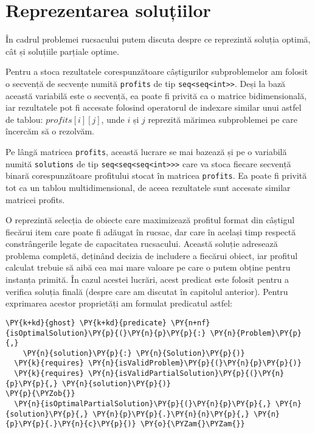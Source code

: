 \chapter{Reprezentarea soluțiilor}

\begin{sloppypar}

În cadrul problemei rucsacului putem discuta despre ce reprezintă soluția optimă, cât și soluțiile parțiale optime. \par
Pentru a stoca rezultatele corespunzătoare câștigurilor subproblemelor am folosit o secvență de secvențe numită \texttt{profits} de tip \texttt{seq<seq<int>>}. Deși la bază această variabilă este o secvență, ea poate fi privită ca o matrice bidimensională, iar rezultatele pot fi accesate folosind operatorul de indexare similar unui astfel de tablou: $profits[i][j]$, unde $i$ și $j$ reprezită mărimea subproblemei pe care încercăm să o rezolvăm. 
\par
Pe lângă matricea \texttt{profits}, această lucrare se mai bazează și pe o variabilă numită \texttt{solutions} de tip \texttt{seq<seq<seq<int>>>} care va stoca fiecare secvență binară corespunzătoare profitului stocat în matricea \texttt{profits}. Ea poate fi privită tot ca un tablou multidimensional, de aceea rezultatele sunt accesate similar matricei profits.
\par
O  reprezintă selecția de obiecte care maximizează profitul format din câștigul fiecărui item care poate fi adăugat în rucsac, dar care în același timp respectă constrângerile legate de capacitatea rucsacului. Această soluție adresează problema completă, deținând decizia de includere a fiecărui obiect, iar profitul calculat trebuie să aibă cea mai mare valoare pe care o putem obține pentru instanța primită.  În cazul acestei lucrări, acest predicat este folosit pentru a verifica soluția finală (despre care am discutat în capitolul anterior). Pentru exprimarea acestor proprietăți am formulat predicatul  astfel:
\begin{Verbatim}[commandchars=\\\{\}]
\PY{k+kd}{ghost} \PY{k+kd}{predicate} \PY{n+nf}{isOptimalSolution}\PY{p}{(}\PY{n}{p}\PY{p}{:} \PY{n}{Problem}\PY{p}{,} 
    \PY{n}{solution}\PY{p}{:} \PY{n}{Solution}\PY{p}{)}
  \PY{k}{requires} \PY{n}{isValidProblem}\PY{p}{(}\PY{n}{p}\PY{p}{)}
  \PY{k}{requires} \PY{n}{isValidPartialSolution}\PY{p}{(}\PY{n}{p}\PY{p}{,} \PY{n}{solution}\PY{p}{)}
\PY{p}{\PYZob{}}
  \PY{n}{isOptimalPartialSolution}\PY{p}{(}\PY{n}{p}\PY{p}{,} \PY{n}{solution}\PY{p}{,} \PY{n}{p}\PY{p}{.}\PY{n}{n}\PY{p}{,} \PY{n}{p}\PY{p}{.}\PY{n}{c}\PY{p}{)} \PY{o}{\PYZam{}\PYZam{}}

\end{Verbatim}
\end{sloppypar}
